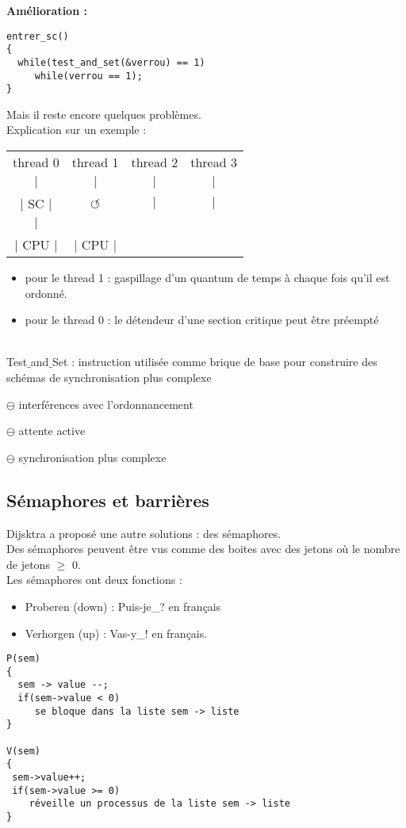 \documentclass[12pt,a4paper]{report}
\begin{document}
\textbf{Amélioration :}
\smallskip
\begin{verbatim}
entrer_sc()
{
  while(test_and_set(&verrou) == 1)
     while(verrou == 1);
}
\end{verbatim}
\bigskip

Mais il reste encore quelques problèmes.\\
Explication sur un exemple :
\begin{center}
\begin{tabular}{c c c c}
thread 0 & thread 1 & thread 2 & thread 3 \\
$\mid$ & $\mid$ & $\mid$ & $\mid$ \\
$\mid$ SC $\mid$ & $\circlearrowleft$ & $\mid$ & $\mid$\\
$\mid$ & & & \\
$\mid$ CPU $\mid$ & $\mid$ CPU $\mid$ & & \\
\end{tabular}
\end{center}

\begin{itemize}
\item pour le thread 1 : gaspillage d'un quantum de temps à chaque fois qu'il est ordonné.
\item pour le thread 0 : le détendeur d'une section critique peut être préempté \\
\\
\end{itemize}

Test$\_$and$\_$Set : instruction utilisée comme brique de base pour construire des schémas de synchronisation plus complexe
\begin{description}
\item$\ominus$ interférences avec l'ordonnancement
\item$\ominus$ attente active
\item$\ominus$ synchronisation plus complexe\\
\end{description}

\subsection{Sémaphores et barrières}
Dijsktra a proposé une autre solutions : des sémaphores.\\
Des sémaphores peuvent être vus comme des boites avec des jetons où le nombre de jetons $\geq$ 0.\\

Les sémaphores ont deux fonctions :
\begin{itemize}
\item Proberen (down) : Puis-je_? en français
\item Verhorgen (up) : Vas-y_! en français.
\end{itemize}
\medskip
\begin{verbatim}
P(sem)
{
  sem -> value --;
  if(sem->value < 0)
     se bloque dans la liste sem -> liste
}

V(sem)
{
 sem->value++;
 if(sem->value >= 0)
    réveille un processus de la liste sem -> liste
}
\end{verbatim}
\end{document}

